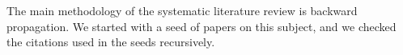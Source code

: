 
The main methodology of the systematic literature review is backward propagation. 
We started with a seed of papers on this subject, and we checked the citations used in the seeds recursively. 